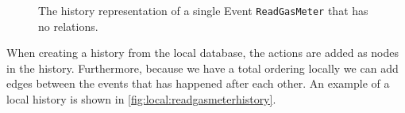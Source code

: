 	\begin{figure}
		\centering
		\def\svgwidth{0.38\textwidth}
		
		\caption{The history representation of a single Event \texttt{ReadGasMeter} that has no relations.}
		\label{fig:local:readgasmeterhistory}
	\end{figure}
	\newpar When creating a history from the local database, the actions are added as nodes in the history. Furthermore, because we have a total ordering locally we can add edges between the events that has happened after each other. An example of a local history is shown in \autoref{fig:local:readgasmeterhistory}.
	
